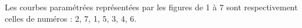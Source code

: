 Les courbes paramétrées représentées par les figures de 1 à 7 sont respectivement celles de numéros : 2, 7, 1, 5, 3, 4, 6.
